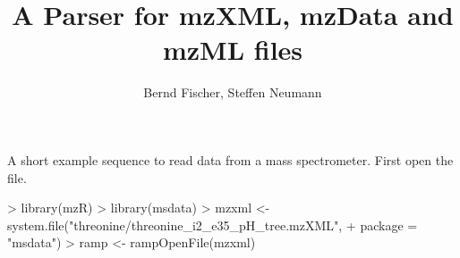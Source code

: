 \documentclass[10pt,a4paper]{article}
\begin{document}
\title{A Parser for mzXML, mzData and mzML files}

\author{Bernd Fischer, Steffen Neumann}

\maketitle

\tableofcontents

A short example sequence to read data from a mass spectrometer. First open the file.

\begin{Schunk}
\begin{Sinput}
> library(mzR)
> library(msdata)
> mzxml <- system.file("threonine/threonine_i2_e35_pH_tree.mzXML", 
+                      package = "msdata")
> ramp <- rampOpenFile(mzxml)
\end{Sinput}
\end{Schunk}
\end{document}
